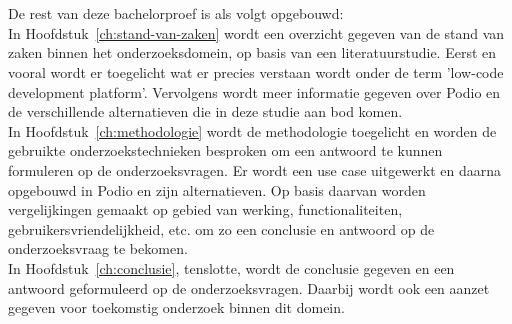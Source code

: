 \section{}%
\label{sec:opzet-bachelorproef} %


De rest van deze bachelorproef is als volgt opgebouwd: \\

In Hoofdstuk~\ref{ch:stand-van-zaken} wordt een overzicht gegeven van de stand van zaken binnen het onderzoeksdomein, op basis van een literatuurstudie. Eerst en vooral wordt er toegelicht wat er precies verstaan wordt onder de term 'low-code development platform'. Vervolgens wordt meer informatie gegeven over Podio en de verschillende alternatieven die in deze studie aan bod komen. \\

In Hoofdstuk~\ref{ch:methodologie} wordt de methodologie toegelicht en worden de gebruikte onderzoekstechnieken besproken om een antwoord te kunnen formuleren op de onderzoeksvragen. Er wordt een use case uitgewerkt en daarna opgebouwd in Podio en zijn alternatieven. Op basis daarvan worden vergelijkingen gemaakt op gebied van werking, functionaliteiten, gebruikersvriendelijkheid, etc. om zo een conclusie en antwoord op de onderzoeksvraag te bekomen. \\

In Hoofdstuk~\ref{ch:conclusie}, tenslotte, wordt de conclusie gegeven en een antwoord geformuleerd op de onderzoeksvragen. Daarbij wordt ook een aanzet gegeven voor toekomstig onderzoek binnen dit domein. \\